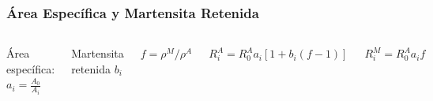 \documentclass[usenames,dvipsnames]{beamer}
\begin{document}
\begin{frame}

\frametitle{Área Específica y Martensita Retenida}
\begin{columns}
Área específica: $a_i=\frac{A_0}{A_i}$ 

\vspace{0.5cm}
Martensita retenida $b_i$

\vspace{0.5cm}
$f=\rho^M / \rho^A$

\vspace{0.5cm}

\begin{block}{$R^A _i=R^A _0 a_i [1+b_i (f-1)]$}
\end{block}


\begin{block}{$ R^M _i  = R^A _0 a_i f$}
\end{block}


\includegraphics[width=\textwidth]{img/resistencia/Histeresis2.eps}

\end{columns}


\end{frame}


\end{document}
